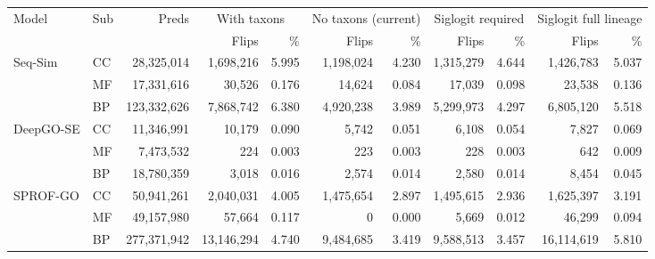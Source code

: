 \begin{tabular}{llrrrrrrrrr}
\toprule
Model & Sub & Preds & \multicolumn{2}{c}{With taxons} & \multicolumn{2}{c}{No taxons (current)} & \multicolumn{2}{c}{Siglogit required} & \multicolumn{2}{c}{Siglogit full lineage} \\
\cmidrule(lr){4-5}\cmidrule(lr){6-7}\cmidrule(lr){8-9}\cmidrule(lr){10-11}
& & & Flips & \% & Flips & \% & Flips & \% & Flips & \% \\
\midrule
Seq-Sim & CC & 28{,}325{,}014 & 1{,}698{,}216 & 5.995 & 1{,}198{,}024 & 4.230 & 1{,}315{,}279 & 4.644 & 1{,}426{,}783 & 5.037 \\
 & MF & 17{,}331{,}616 & 30{,}526 & 0.176 & 14{,}624 & 0.084 & 17{,}039 & 0.098 & 23{,}538 & 0.136 \\
 & BP & 123{,}332{,}626 & 7{,}868{,}742 & 6.380 & 4{,}920{,}238 & 3.989 & 5{,}299{,}973 & 4.297 & 6{,}805{,}120 & 5.518 \\
\midrule
DeepGO-SE & CC & 11{,}346{,}991 & 10{,}179 & 0.090 & 5{,}742 & 0.051 & 6{,}108 & 0.054 & 7{,}827 & 0.069 \\
 & MF & 7{,}473{,}532 & 224 & 0.003 & 223 & 0.003 & 228 & 0.003 & 642 & 0.009 \\
 & BP & 18{,}780{,}359 & 3{,}018 & 0.016 & 2{,}574 & 0.014 & 2{,}580 & 0.014 & 8{,}454 & 0.045 \\
\midrule
SPROF-GO & CC & 50{,}941{,}261 & 2{,}040{,}031 & 4.005 & 1{,}475{,}654 & 2.897 & 1{,}495{,}615 & 2.936 & 1{,}625{,}397 & 3.191 \\
 & MF & 49{,}157{,}980 & 57{,}664 & 0.117 & 0 & 0.000 & 5{,}669 & 0.012 & 46{,}299 & 0.094 \\
 & BP & 277{,}371{,}942 & 13{,}146{,}294 & 4.740 & 9{,}484{,}685 & 3.419 & 9{,}588{,}513 & 3.457 & 16{,}114{,}619 & 5.810 \\
\bottomrule
\end{tabular}
